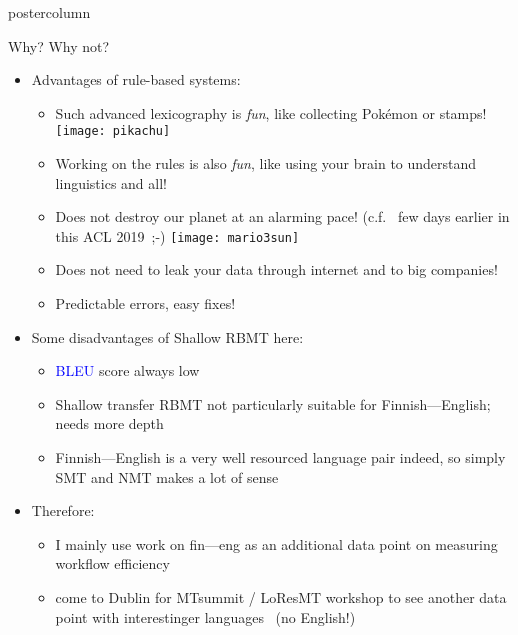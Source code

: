 \documentclass[final,hyperref={pdfpagelabels}]{beamer}
\begin{document}
\begin{frame}
\begin{columns}
\begin{column}{.49\textwidth}
\begin{beamercolorbox}[center,wd=\textwidth]{postercolumn}
\begin{minipage}[T]{.95\textwidth}
{        \begin{block}{Why? Why not?}
            \begin{itemize}
                \item Advantages of rule-based systems:
                    \begin{itemize}
                        \item Such advanced lexicography is \textit{fun}, like
                            collecting Pokémon or stamps!
                            \texttt{[image: pikachu]}
                        \item Working on the rules is also \textit{fun},
                            like using your brain to understand linguistics
                            and all!
                        \item Does not destroy our planet at an alarming pace!
                            (c.f.~\cite{strubell2019energy} few days earlier in
                            this ACL 2019~;-)
                            \texttt{[image: mario3sun]}
                        \item Does not need to leak your data through internet
                            and to big companies!
                        \item Predictable errors, easy fixes!
                    \end{itemize}
                \item Some disadvantages of Shallow RBMT here:
                    \begin{itemize}
                        \item \textcolor{blue}{BLEU} score always low
                        \item Shallow transfer RBMT not particularly suitable
                            for Finnish---English; needs more depth
                        \item Finnish---English is a very well resourced
                            language pair indeed, so simply SMT and NMT makes
                            a lot of sense
                    \end{itemize}
                \item Therefore:
                    \begin{itemize}
                        \item I mainly use work on fin---eng as an additional
                            data point on measuring workflow efficiency
                        \item come to Dublin for MTsummit / LoResMT workshop to
                            see another data point with interestinger
                            languages~\cite{pirinen2019workflows} (no English!)
                    \end{itemize}
            \end{itemize}
        \end{block}

}
\end{minipage}
\end{beamercolorbox}
\end{column}
\end{columns}
\end{frame}
\end{document}
